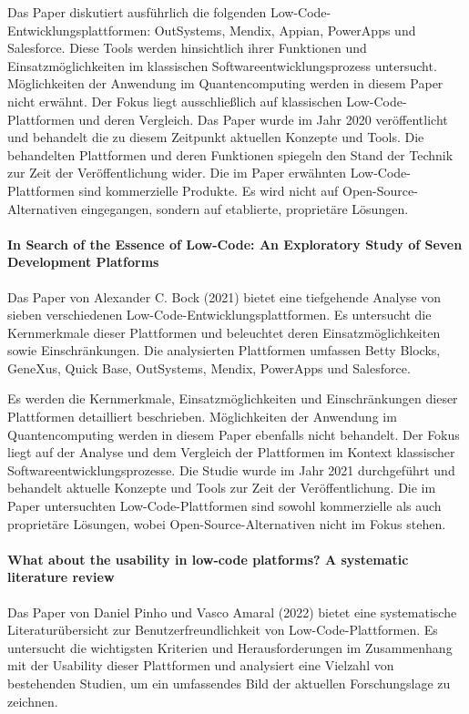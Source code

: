 Das Paper diskutiert ausführlich die folgenden Low-Code-Entwicklungsplattformen: OutSystems, Mendix, Appian, PowerApps und Salesforce. 
Diese Tools werden hinsichtlich ihrer Funktionen und Einsatzmöglichkeiten im klassischen Softwareentwicklungsprozess untersucht.
Möglichkeiten der Anwendung im Quantencomputing werden in diesem Paper nicht erwähnt. Der Fokus liegt ausschließlich auf klassischen 
Low-Code-Plattformen und deren Vergleich.
Das Paper wurde im Jahr 2020 veröffentlicht und behandelt die zu diesem Zeitpunkt aktuellen Konzepte und Tools. Die behandelten 
Plattformen und deren Funktionen spiegeln den Stand der Technik zur Zeit der Veröffentlichung wider.
Die im Paper erwähnten Low-Code-Plattformen sind kommerzielle Produkte. Es wird nicht auf Open-Source-Alternativen 
eingegangen, sondern auf etablierte, proprietäre Lösungen.

\paragraph{In Search of the Essence of Low-Code: An Exploratory Study of Seven Development Platforms}

Das Paper von Alexander C. Bock (2021) bietet eine tiefgehende Analyse von sieben verschiedenen Low-Code-Entwicklungsplattformen. 
Es untersucht die Kernmerkmale dieser Plattformen und beleuchtet deren Einsatzmöglichkeiten sowie Einschränkungen. Die analysierten 
Plattformen umfassen Betty Blocks, GeneXus, Quick Base, OutSystems, Mendix, PowerApps und Salesforce.

Es werden die Kernmerkmale, Einsatzmöglichkeiten und Einschränkungen dieser Plattformen detailliert beschrieben. 
Möglichkeiten der Anwendung im Quantencomputing werden in diesem Paper ebenfalls nicht behandelt. 
Der Fokus liegt auf der Analyse und dem Vergleich der Plattformen im Kontext klassischer Softwareentwicklungsprozesse. 
Die Studie wurde im Jahr 2021 durchgeführt und behandelt aktuelle Konzepte und Tools zur Zeit der Veröffentlichung. 
Die im Paper untersuchten Low-Code-Plattformen sind sowohl kommerzielle als auch proprietäre Lösungen, 
wobei Open-Source-Alternativen nicht im Fokus stehen.

\paragraph{What about the usability in low-code platforms? A systematic literature review}

Das Paper von Daniel Pinho und Vasco Amaral (2022) bietet eine systematische Literaturübersicht zur Benutzerfreundlichkeit von 
Low-Code-Plattformen. Es untersucht die wichtigsten Kriterien und Herausforderungen im Zusammenhang mit der Usability 
dieser Plattformen und analysiert eine Vielzahl von bestehenden Studien, um ein umfassendes Bild der aktuellen Forschungslage zu zeichnen.

